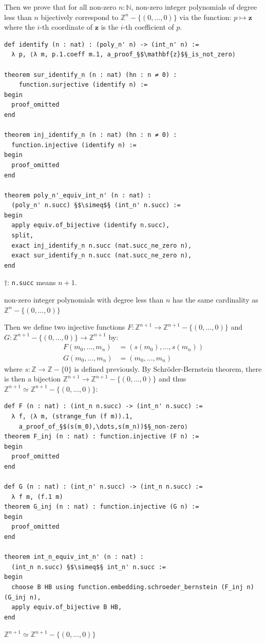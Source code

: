 \documentclass{report}
\theoremstyle{definition}
\newenvironment{code}{\captionsetup{type=listing}}{}
\begin{document}
Then we prove that for all non-zero $n:\mathbb N$, non-zero integer polynomials of degree less than $n$ bijectively correspond to $\mathbb Z^n-\{(0,\dots,0)\}$ via the function:
$p\mapsto \mathbf{z}$ where the $i$-th coordinate of $\mathbf{z}$ is the $i$-th coefficient of $p$.
\begin{code}
\begin{verbatim}
def identify (n : nat) : (poly_n' n) -> (int_n' n) := 
  λ p, ⟨λ m, p.1.coeff m.1, a_proof_§$\mathbf{z}$§_is_not_zero⟩

theorem sur_identify_n (n : nat) (hn : n ≠ 0) : 
    function.surjective (identify n) :=
begin
  proof_omitted
end

theorem inj_identify_n (n : nat) (hn : n ≠ 0) : 
  function.injective (identify n) :=
begin
  proof_omitted
end

theorem poly_n'_equiv_int_n' (n : nat) : 
  (poly_n' n.succ) §$\simeq$§ (int_n' n.succ) :=
begin
  apply equiv.of_bijective (identify n.succ),
  split,
  exact inj_identify_n n.succ (nat.succ_ne_zero n),
  exact sur_identify_n n.succ (nat.succ_ne_zero n),
end
\end{verbatim}
$\dagger$: {\tt\small n.succ} means $n+1$.
\caption{non-zero integer polynomials with degree less than $n$ has the same cardinality as $\mathbb Z^n-\{(0,\dots,0)\}$}
\end{code}

Then we define two injective functions $F : \mathbb{Z}^{n+1}\to\mathbb{Z}^{n+1}-\{(0,\dots,0)\}$ and $G : \mathbb{Z}^{n+1}-\{(0,\dots,0)\}\to\mathbb{Z}^{n+1}$ by:
\begin{equation*}
\begin{aligned}
F (m_0,\dots,m_n) &= (s(m_0),\dots,s(m_n)) \\
G (m_0,\dots,m_n) &= (m_0,\dots,m_n)
\end{aligned}
\end{equation*}
where $s:\mathbb Z\to \mathbb Z-\{0\}$ is defined previously. By Schröder-Bernstein theorem, there is then a bijection $\mathbb{Z}^{n+1}\to\mathbb{Z}^{n+1}-\{(0,\dots,0)\}$ and thus $\mathbb{Z}^{n+1}\simeq\mathbb{Z}^{n+1}-\{(0,\dots,0)\}$:
\begin{code}
\begin{verbatim}
def F (n : nat) : (int_n n.succ) -> (int_n' n.succ) := 
  λ f, ⟨λ m, (strange_fun (f m)).1,
    a_proof_of_§$(s(m_0),\dots,s(m_n))$§_non-zero⟩
theorem F_inj (n : nat) : function.injective (F n) :=
begin
  proof_omitted
end

def G (n : nat) : (int_n' n.succ) -> (int_n n.succ) := 
  λ f m, (f.1 m)
theorem G_inj (n : nat) : function.injective (G n) :=
begin
  proof_omitted
end

theorem int_n_equiv_int_n' (n : nat) : 
  (int_n n.succ) §$\simeq$§ int_n' n.succ :=
begin
  choose B HB using function.embedding.schroeder_bernstein (F_inj n) (G_inj n),
  apply equiv.of_bijective B HB,
end
\end{verbatim}
\caption{$\mathbb{Z}^{n+1}\simeq\mathbb{Z}^{n+1}-\{(0,\dots,0)\}$}
\end{code}
\end{document}
